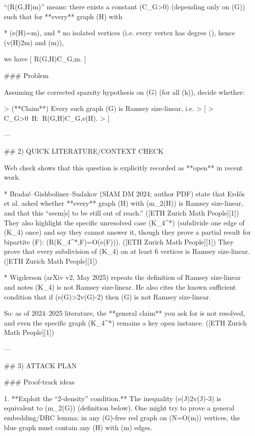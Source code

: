 “(R(G,H)\ll m)” means: there exists a constant (C_G>0) (depending only on (G)) such that for **every** graph (H) with

* (e(H)=m), and
* no isolated vertices (i.e. every vertex has degree (), hence (v(H)\le 2m) and (m)),

we have
[
R(G,H)\le C_G,m.
]

### Problem

Assuming the corrected sparsity hypothesis on (G) (for all (k)), decide whether:

> (**Claim**) Every such graph (G) is Ramsey size-linear, i.e.
> [
> \exists C_G>0\ \forall H:\ R(G,H)\le C_G,e(H).
> ]

---

## 2) QUICK LITERATURE/CONTEXT CHECK

Web check shows that this question is explicitly recorded as **open** in recent work.

* Bradač–Gishboliner–Sudakov (SIAM DM 2024; author PDF) state that Erdős et al. asked whether **every** graph (H) with (m_2(H)) is Ramsey size-linear, and that this “seem[s] to be still out of reach.” ([ETH Zurich Math People][1])
  They also highlight the specific unresolved case (K_4^*) (subdivide one edge of (K_4) once) and say they cannot answer it, though they prove a partial result for bipartite (F): (R(K_4^*,F)=O(e(F))). ([ETH Zurich Math People][1])
  They prove that every subdivision of (K_4) on at least 6 vertices is Ramsey size-linear. ([ETH Zurich Math People][1])

* Wigderson (arXiv v2, May 2025) repeats the definition of Ramsey size-linear and notes (K_4) is not Ramsey size-linear. 
  He also cites the known sufficient condition that if (e(G)>2v(G)-2) then (G) is not Ramsey size-linear. 

So: as of 2024–2025 literature, the **general claim** you ask for is not resolved, and even the specific graph (K_4^*) remains a key open instance. ([ETH Zurich Math People][1])

---

## 3) ATTACK PLAN

### Proof-track ideas

1. **Exploit the “2-density” condition.**
   The inequality (e(J)\le 2v(J)-3) is equivalent to (m_2(G)) (definition below). One might try to prove a general embedding/DRC lemma: in any (G)-free red graph on (N=O(m)) vertices, the blue graph must contain any (H) with (m) edges.

